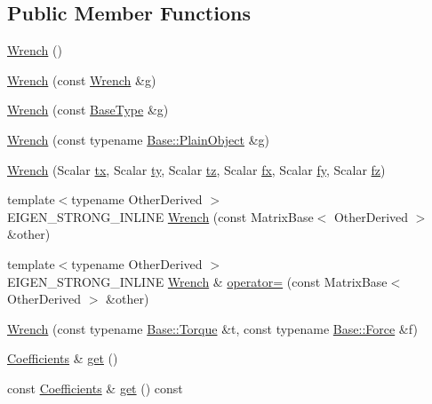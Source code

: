 \subsection*{Public Member Functions}
\begin{DoxyCompactItemize}
\item 
\hyperlink{class_wrench_a748f2f5a35ee560efa9baa6b7cf3457b}{Wrench} ()
\item 
\hyperlink{class_wrench_a248ef8976ae4ba0cb0023888777be19b}{Wrench} (const \hyperlink{class_wrench}{Wrench} \&g)
\item 
\hyperlink{class_wrench_a39e8751dfbcc808085e7ae9408659243}{Wrench} (const \hyperlink{class_wrench_abc5de6653f57de3beb6335e474fc2802}{Base\+Type} \&g)
\item 
\hyperlink{class_wrench_a9748492aa7f5e07665db15b64a525f9d}{Wrench} (const typename \hyperlink{class_lie_algebra_dual_base_a9b59cead2f78ed837cd22a96155e5da3}{Base\+::\+Plain\+Object} \&g)
\item 
\hyperlink{class_wrench_a82d1e4cba2590bc6380c395012d74102}{Wrench} (Scalar \hyperlink{class_wrench_base_a28eccf6ee6ec9a0e8ad6f0a130c17f0a}{tx}, Scalar \hyperlink{class_wrench_base_a7d574941740c725e035df6af20c0af6c}{ty}, Scalar \hyperlink{class_wrench_base_accf6a99e5dd656d46a0e848add0c9e85}{tz}, Scalar \hyperlink{class_wrench_base_ab4883d6553bab8cbe99737b664cbbd31}{fx}, Scalar \hyperlink{class_wrench_base_a9cf08f34e7d12b9fda2cd521fbca527e}{fy}, Scalar \hyperlink{class_wrench_base_a045d6010d317ce4ee578bfcf1f0162c7}{fz})
\item 
{\footnotesize template$<$typename Other\+Derived $>$ }\\E\+I\+G\+E\+N\+\_\+\+S\+T\+R\+O\+N\+G\+\_\+\+I\+N\+L\+I\+NE \hyperlink{class_wrench_aa3975c26b9d785fc956c86c9bcf82a39}{Wrench} (const Matrix\+Base$<$ Other\+Derived $>$ \&other)
\item 
{\footnotesize template$<$typename Other\+Derived $>$ }\\E\+I\+G\+E\+N\+\_\+\+S\+T\+R\+O\+N\+G\+\_\+\+I\+N\+L\+I\+NE \hyperlink{class_wrench}{Wrench} \& \hyperlink{class_wrench_aaafc24af18da8389e4d7e92c5c4ade90}{operator=} (const Matrix\+Base$<$ Other\+Derived $>$ \&other)
\item 
\hyperlink{class_wrench_a5674ee39466b179af823f10a07427b3a}{Wrench} (const typename \hyperlink{class_wrench_base_a8fa1b5e32e8418247118cc24be70d68d}{Base\+::\+Torque} \&t, const typename \hyperlink{class_wrench_base_aa589699bbf0d18c023a0a2fe6482b4a7}{Base\+::\+Force} \&f)
\item 
\hyperlink{class_wrench_a3b7401ec055bd386fc3dc826308784e8}{Coefficients} \& \hyperlink{class_wrench_abb89a8f4d5642c705ec591f02daaf11a}{get} ()
\item 
const \hyperlink{class_wrench_a3b7401ec055bd386fc3dc826308784e8}{Coefficients} \& \hyperlink{class_wrench_afaea09f03cfc476c06e005d4a338a57f}{get} () const
\end{DoxyCompactItemize}

